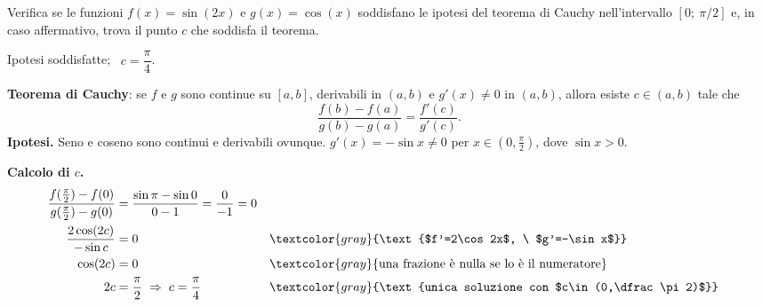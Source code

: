 \begin{question}[ID=1.2, subtitle={Teorema di Cauchy per $\sin(2x)$ e $\cos x$ su $[0,\pi/2]$}, tags={cauchy, teoremi}, difficulty=media]
Verifica se le funzioni \(f(x) = \sin(2x)\) e \(g(x) = \cos(x)\) soddisfano le ipotesi del teorema di Cauchy nell'intervallo \([0;\ \pi/2]\) e, in caso affermativo, trova il punto \(c\) che soddisfa il teorema.
\begin{solution}
Ipotesi soddisfatte; \ $c=\dfrac\pi4$.
\end{solution}
\begin{explanation}
\textbf{Teorema di Cauchy}: se $f$ e $g$ sono continue su $[a,b]$, derivabili in $(a,b)$ e $g'(x)\neq0$ in $(a,b)$, allora esiste $c\in(a,b)$ tale che
\[ \dfrac{f(b)-f(a)}{g(b)-g(a)}=\dfrac{f'(c)}{g'(c)}. \]
\textbf{Ipotesi.} Seno e coseno sono continui e derivabili ovunque. $g'(x)=-\sin x\neq0$ per $x\in\left(0,\tfrac\pi2\right)$, dove $\sin x>0$.

\textbf{Calcolo di $c$.}
\[\begin{aligned}
\dfrac{f(\frac\pi2)-f(0)}{g(\frac\pi2)-g(0)} &= \dfrac{\sin\pi-\sin0}{0-1}=\dfrac{0}{-1}=0\\
\dfrac{2\cos(2c)}{-\sin c} &= 0 && \textcolor{gray}{\text{$f'=2\cos2x$, \ $g'=-\sin x$}}\\
\cos(2c) &= 0 && \textcolor{gray}{\text{una frazione è nulla se lo è il numeratore}}\\
2c &= \dfrac\pi2 \;\Rightarrow\; c=\dfrac\pi4 && \textcolor{gray}{\text{unica soluzione con $c\in(0,\dfrac\pi2)$}}
\end{aligned}\]
\end{explanation}
\end{question}


